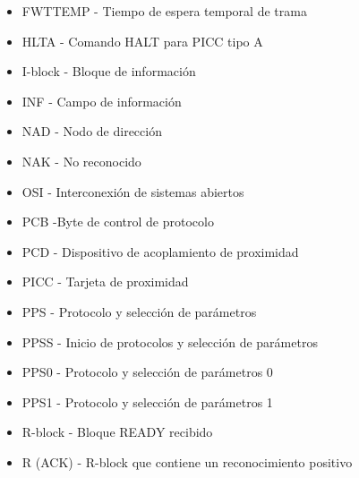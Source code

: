 \begin{itemize}
	\item FWTTEMP - Tiempo de espera temporal de trama\par

	\item HLTA - Comando HALT para PICC tipo A\par

	\item I-block - Bloque de información\par

	\item INF - Campo de información\par

	\item NAD - Nodo de dirección\par

	\item NAK - No reconocido\par

	\item OSI - Interconexión de sistemas abiertos\par

	\item PCB -Byte de control de protocolo\par

	\item PCD - Dispositivo de acoplamiento de proximidad\par

	\item PICC - Tarjeta de proximidad\par

	\item PPS - Protocolo y selección de parámetros\par

	\item PPSS - Inicio de protocolos y selección de parámetros\par

	\item PPS0 - Protocolo y selección de parámetros 0\par

	\item PPS1 - Protocolo y selección de parámetros 1\par

	\item R-block - Bloque READY recibido\par

	\item R (ACK) - R-block que contiene un reconocimiento positivo\par


\end{itemize}
